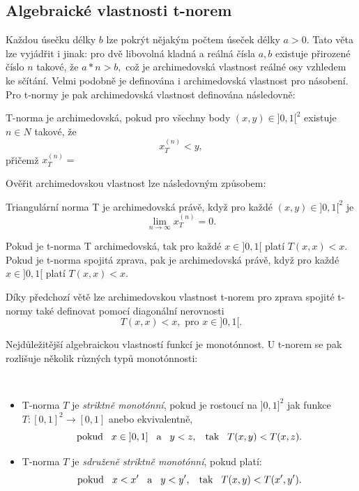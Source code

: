 \subsection{Algebraick\'e vlastnosti t-norem}

Každou \' usečku délky $b$ lze pokrýt nějakým počtem \' useček délky $a > 0.$ Tato věta lze vyjádřit i jinak: pro dvě libovolná kladná a reálná čísla $a,b$ existuje přirozené číslo $n$ takové, že $a*n>b,$ což je archimedovská vlastnost reálné osy vzhledem ke sčítání. Velmi podobně je definována i archimedovská vlastnost pro násobení. Pro t-normy je pak archimedovská vlastnost definována následovně:
\begin{definition}
\cite{KMP}
    T-norma je archimedovská, pokud pro všechny body $(x,y) \in ]0,1[^2$ existuje $n \in N$ takové, že $$x_T^{(n)} < y,$$
    p\v ri\v cem\v z $x^{(n)}_T=$
\end{definition}
Ověřit archimedovskou vlastnost lze následovným zp\r usobem:
\begin{sentence} \cite{KMP}
    Triangulární norma T je archimedovská právě, když pro každé $(x,y) \in ]0,1[^2$ je $$\lim_{n \to \infty}x_T^{(n)} = 0.$$
\end{sentence}
\begin{sentence} \cite{KMP}
    Pokud je t-norma T archimedovská, tak pro každé $x \in ]0,1[$ platí $T(x,x) < x.$\\
    Pokud je t-norma spojitá zprava, pak je archimedovská právě, když pro každé $x \in ]0,1[$ platí $T(x,x) < x.$
\end{sentence}

    Díky p\v redchozí v\v et\v e lze  archimedovskou vlastnost t-norem pro zprava spojit\'e t-normy také definovat pomocí diagonální nerovnosti $$T(x,x) < x, \mbox{ pro } x \in ]0,1[.$$

    Nejd\r uležitější algebraickou vlastností funkcí je monot\' onnost. U t-norem se pak rozlišuje několik r\r uzných typ\r u monot\' onnosti:
    \begin{definition}
    \cite{KMP}\\
        \begin{itemize}
            \item T-norma $T$ je {\em striktně
            monot\' onní}, pokud
            je rostoucí na $]0,1]^2$ jak funkce $ T:[0,1]^2 \rightarrow [0,1]$ anebo
            ekvivalentně,
            $$ \text {pokud} \hskip 3mm x \in \hskip 1mm ]0,1] \hskip 3mm \text{a} \hskip 3mm y < z, \hskip 3mm \text {tak} \hskip 3mm T(x,y) < T(x,z). $$
            \item  T-norma $T$ je {\em sdruženě striktně
            monot\' onní}, pokud platí:
            $$ \text{pokud} \hskip 3mm  x < x'\hskip 3mm \text{a} \hskip 3mm y<y',
            \hskip 3mm  \text{tak} \hskip 3mm   T(x,y)<T(x',y').$$
            \end{itemize}
    \end{definition}

